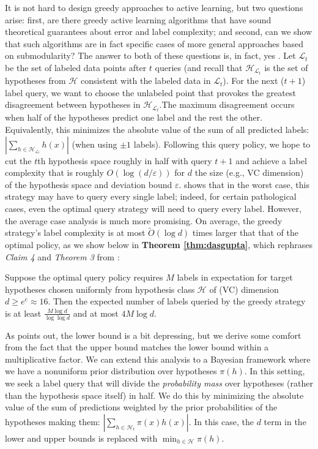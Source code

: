 It is not hard to design greedy approaches to active learning, but two questions arise: first, are there greedy active learning algorithms that have sound theoretical guarantees about error and label complexity; and second, can we show that such algorithms are in fact specific cases of more general approaches based on submodularity? The answer to both of these questions is, in fact, yes \cite{dasgupta2004}. Let $\mathcal{L}_t$ be the set of labeled data points after $t$ queries (and recall that $\mathcal{H}_{\mathcal{L}_t}$ is the set of hypotheses from $\mathcal{H}$ consistent with the labeled data in $\mathcal{L}_t$). For the next ($t+1$) label query, we want to choose the unlabeled point that provokes the greatest disagreement between hypotheses in $\mathcal{H}_{\mathcal{L}_t}$.The maximum disagreement occurs when half of the hypotheses predict one label and the rest the other. Equivalently, this minimizes the absolute value of the sum of all predicted labels: $| \sum_{h \in \mathcal{H}_{\mathcal{L}_t}} h(x)|$ (when using $\pm1$ labels). Following this query policy, we hope to cut the $t$th hypothesis space roughly in half with query $t+1$ and achieve a label complexity that is roughly $O(\log (d/\varepsilon))$ for $d$ the size (e.g., VC dimension) of the hypothesis space and deviation bound $\varepsilon$. \cite{dasgupta2004} shows that in the worst case, this strategy may have to query every single label; indeed, for certain pathological cases, even the optimal query strategy will need to query every label. However, the average case analysis is much more promising. On average, the greedy strategy's label complexity is at most $\widetilde{O}(\log d)$ times larger that that of the optimal policy, as we show below in \textbf{Theorem \ref{thm:dasgupta}}, which rephrases \textit{Claim 4} and \textit{Theorem 3} from \cite{dasgupta2004}:\\

\begin{theorem}
\label{thm:dasgupta}
Suppose the optimal query policy requires $M$ labels in expectation for target hypotheses chosen uniformly from hypothesis class $\mathcal{H}$ of (VC) dimension $d \geq e^e \approx 16$. Then the expected number of labels queried by the greedy strategy is at least $\frac{M \log d}{\log \log d}$ and at most $4 M \log d$.
\end{theorem}

As \cite{dasgupta2004} points out, the lower bound is a bit depressing, but we derive some comfort from the fact that the upper bound matches the lower bound within a multiplicative factor. We can extend this analysis to a Bayesian framework where we have a nonuniform prior distribution over hypotheses $\pi(h)$. In this setting, we seek a label query that will divide the \textit{probability mass} over hypotheses (rather than the hypothesis space itself) in half. We do this by minimizing the absolute value of the sum of predictions weighted by the prior probabilities of the hypotheses making them: $| \sum_{h \in \mathcal{H}_t} \pi(x) h(x)|$. In this case, the $d$ term in the lower and upper bounds is replaced with $\min_{h \in \mathcal{H}} \pi(h)$.

